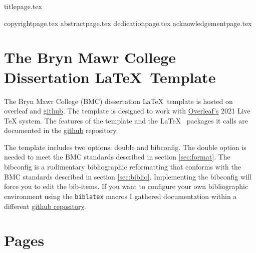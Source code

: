 \documentclass[12pt]{report}
\begin{document}
{titlepage.tex} %

{copyrightpage.tex}
{abstractpage.tex}
\setcounter{page}{2}
{dedicationpage.tex}
{acknowledgementpage.tex}
\newpage
\tableofcontents
\newpage
\begin{singlespacing}
\listoffigures
\end{singlespacing}
\newpage
\listoftables
{}

\newpage
\listofappendices
{}
\newpage

\chapter{The Bryn Mawr College Dissertation \LaTeX~Template}
The Bryn Mawr College (BMC) dissertation \LaTeX~template is hosted on overleaf and \href{https://github.com/cacsphysics/BMC_Dissertation_Template}{github}. The template is designed to work with \href{https://www.overleaf.com/for/authors}{Overleaf's} 2021 Live TeX system. The features of the template and the \LaTeX~ packages it calls are documented in the \href{https://github.com/cacsphysics/BMC_Dissertation_Template}{github} repository.

The template includes two options: double and bibconfig. The double option is needed to meet the BMC standards described in section \ref{sec:format}. The bibconfig is a rudimentary bibliographic reformatting that conforms with the BMC standards described in section \ref{sec:biblio}. Implementing the bibconfig will force you to edit the bib-items. If you want to configure your own bibliographic environment using the \verb|biblatex| macros I gathered documentation within a different \href{https://github.com/cacsphysics/BMC_Template_Info_Files}{github repository}.

\chapter{Pages}
\end{document}
